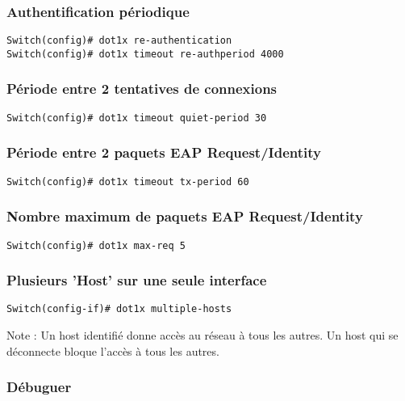 \subsubsection{Authentification périodique}

\begin{verbatim}
Switch(config)# dot1x re-authentication
Switch(config)# dot1x timeout re-authperiod 4000
\end{verbatim}

\subsubsection{Période entre 2 tentatives de connexions}

\begin{verbatim}
Switch(config)# dot1x timeout quiet-period 30
\end{verbatim}

\subsubsection{Période entre 2 paquets EAP Request/Identity}

\begin{verbatim}
Switch(config)# dot1x timeout tx-period 60
\end{verbatim}

\subsubsection{Nombre maximum de paquets EAP Request/Identity}

\begin{verbatim}
Switch(config)# dot1x max-req 5
\end{verbatim}

\subsubsection{Plusieurs 'Host' sur une seule interface}

\begin{verbatim}
Switch(config-if)# dot1x multiple-hosts
\end{verbatim}

Note : Un host identifié donne accès au réseau à tous les autres. Un host qui se déconnecte bloque l'accès à tous les autres.

\subsubsection{Débuguer}

